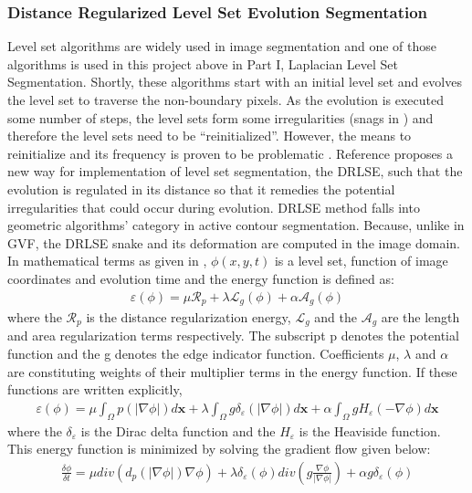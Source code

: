 \documentclass{article}
\begin{document}
\subsubsection*{Distance Regularized Level Set Evolution Segmentation}
Level set algorithms are widely used in image segmentation and one of those algorithms is used in this project above in Part I, Laplacian Level Set Segmentation. Shortly, these algorithms start with an initial level set and evolves the level set to traverse the non-boundary pixels. As the evolution is executed some number of steps, the level sets form some irregularities (snags in \cite{hieber}) and therefore the level sets need to be ``reinitialized''. However, the means to reinitialize and its frequency is proven to be problematic \cite{drlse}. Reference \cite{drlse} proposes a new way for implementation of level set segmentation, the DRLSE, such that the evolution is regulated in its distance so that it remedies the potential irregularities that could occur during evolution. DRLSE method falls into geometric algorithms' category in active contour segmentation. Because, unlike in GVF, the DRLSE snake and its deformation are computed in the image domain. In mathematical terms as given in \cite{drlse}, $\phi(x,y,t)$ is a level set, function of image coordinates and evolution time and the energy function is defined as:
\begin{align*}
\varepsilon(\phi) = \mu \mathcal{R}_p + \lambda \mathcal{L}_g (\phi)+\alpha \mathcal{A}_g (\phi)
\end{align*}
where the $\mathcal{R}_p$ is the distance regularization energy, $\mathcal{L}_g$ and the $ \mathcal{A}_g$ are the length and area regularization terms respectively. The subscript p denotes the potential function and the g denotes the edge indicator function. Coefficients $\mu$, $\lambda$ and $\alpha$ are constituting weights of their multiplier terms in the energy function. If these functions are written explicitly,
\begin{align*}
\varepsilon(\phi) = \mu\int_\Omega p(|\nabla \phi | ) d \mathbf{x} +  \lambda\int_\Omega g\delta_{\varepsilon}(|\nabla \phi | ) d \mathbf{x} +  \alpha \int_\Omega g H_{\varepsilon}(- \nabla \phi  ) d \mathbf{x} 
\end{align*}
where the $\delta_{\varepsilon}$ is the Dirac delta function and the $H_{\varepsilon}$ is the Heaviside function. This energy function is minimized by solving the gradient flow given below:
\begin{align*}
\frac{\delta \phi}{\delta t} = \mu div(d_p( |\nabla \phi | ) \nabla \phi ) + \lambda \delta_{\varepsilon}(\phi)div \left( g \frac{\nabla \phi}{|\nabla \phi|} \right) + \alpha g \delta_{\varepsilon}(\phi)
\end{align*}
\end{document}
